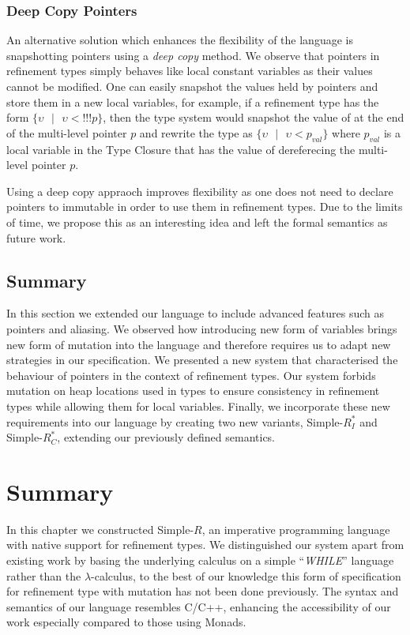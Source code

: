 \documentclass[a4paper,12pt]{report}
\begin{document}
\subsubsection{Deep Copy Pointers}
An alternative solution which enhances the flexibility of the language is 
snapshotting pointers using a \emph{deep copy} method. We observe that pointers in 
refinement types simply behaves like local constant variables as 
their values cannot be modified. One can easily snapshot the values held by pointers 
and store them in a new local variables, for example, if a 
refinement type has the form $\{\upsilon \text{ }|\text{ }\upsilon < !!!p\}$, 
then the type system would snapshot the value of at the end of the multi-level 
pointer $p$ and rewrite the type as $\{\upsilon \text{ }|\text{ }\upsilon < p_{val}\}$ 
where $p_{val}$ is a local variable in the Type Closure that has the 
value of dereferecing the multi-level pointer $p$.

\par
Using a deep copy appraoch improves flexibility as one does not need to declare 
pointers to immutable in order to use them in refinement types. Due to the 
limits of time, we propose this as an interesting idea and left the formal 
semantics as future work. 

\subsection{Summary}
\par
In this section we extended our language to include advanced features such 
as pointers and aliasing. We observed how introducing new form of 
variables brings new form of mutation into the language and therefore 
requires us to adapt new strategies in our specification. We presented  
a new system that characterised the behaviour of pointers in the context of 
refinement types. Our system forbids mutation on heap locations used in types 
to ensure consistency in refinement types while allowing them for local variables. 
Finally, we incorporate these new requirements 
into our language by creating two new variants, Simple-$R^{*}_{I}$ 
and Simple-$R^{*}_{C}$, extending our previously defined semantics. 

\section{Summary}
In this chapter we constructed Simple-$R$, an imperative programming language with native 
support for refinement types. We distinguished our 
system apart from existing work by basing the underlying calculus 
on a simple ``\textit{WHILE}'' language 
rather than the $\lambda$-calculus, to the best of our knowledge this form of 
specification for refinement type with mutation has not been done 
previously. The syntax and semantics of our 
language resembles C/C++, enhancing the accessibility of our work especially 
compared to those using Monads.
\end{document}
